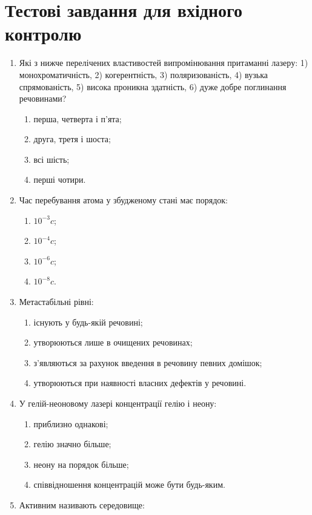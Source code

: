 \documentclass[twocolumn]{el-author}
\begin{document}
\clearpage
\section{Тестові завдання для вхідного контролю}

\begin{enumerate}
	\item Які з нижче перелічених властивостей випромінювання притаманні лазеру:
1) монохроматичність, 2) когерентність, 3) поляризованість, 4) вузька
спрямованість, 5) висока проникна здатність, 6) дуже добре поглинання
речовинами?
	\begin{enumerate}
		\item перша, четверта і п'ята;
		\item друга, третя і шоста;
		\item всі шість;
		\item перші чотири.
	\end{enumerate}
	\item Час перебування атома у збудженому стані має порядок:
	\begin{enumerate}
		\item $10^{-3}c$;
		\item $10^{-4}c$;
		\item $10^{-6}c$;
		\item $10^{-8}c$.
	\end{enumerate}
	\item Метастабільні рівні:
	\begin{enumerate}
		\item існують у будь-якій речовині;
		\item утворюються лише в очищених речовинах;
		\item з'являються за рахунок введення в речовину певних домішок;
		\item утворюються при наявності власних дефектів у речовині.
	\end{enumerate}
	\item У гелій-неоновому лазері концентрації гелію і неону:
	\begin{enumerate}
		\item приблизно однакові;
		\item гелію значно більше;
		\item неону на порядок більше;
		\item співвідношення концентрацій може бути будь-яким.
	\end{enumerate}
	\item Активним називають середовище:
	\begin{enumerate}

\end{enumerate}
\end{enumerate}
\end{document}
